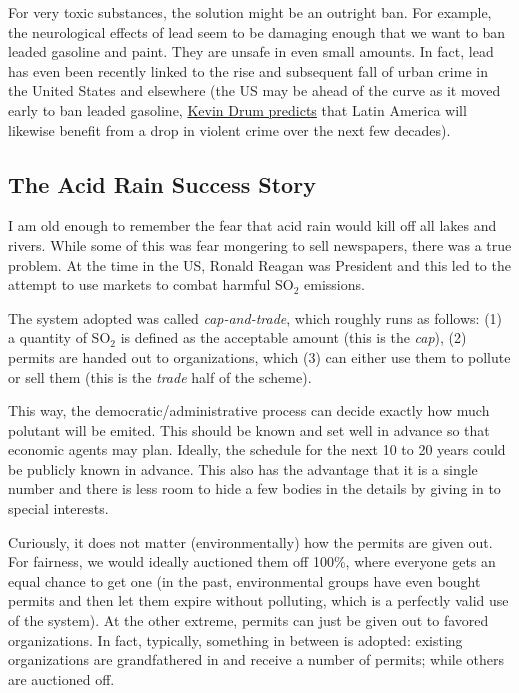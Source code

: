 For very toxic substances, the solution might be an outright ban. For example,
the neurological effects of lead seem to be damaging enough that we want to ban
leaded gasoline and paint. They are unsafe in even small amounts. In fact, lead
has even been recently linked to the rise and subsequent fall of urban crime in
the United States and elsewhere (the US may be ahead of the curve as it moved
early to ban leaded gasoline,
\href{http://www.motherjones.com/kevin-drum/2013/01/lead-and-crime-ill-be-melissa-harris-perry-show-sunday-10-am}{Kevin
Drum predicts} that Latin America will likewise benefit from a drop in violent
crime over the next few decades).

% 

\subsection{The Acid Rain Success Story}

I am old enough to remember the fear that acid rain would kill off all lakes
and rivers. While some of this was fear mongering to sell newspapers, there was
a true problem. At the time in the US, Ronald Reagan was President and this led
to the attempt to use markets to combat harmful SO${}_2$ emissions.

The system adopted was called \emph{cap-and-trade}, which roughly runs as
follows: (1) a quantity of SO${}_2$ is defined as the acceptable amount (this
is the \emph{cap}), (2) permits are handed out to organizations, which (3) can
either use them to pollute or sell them (this is the \emph{trade} half of the
scheme).

This way, the democratic/administrative process can decide exactly how much
polutant will be emited. This should be known and set well in advance so that
economic agents may plan. Ideally, the schedule for the next 10 to 20 years
could be publicly known in advance. This also has the advantage that it is a
single number and there is less room to hide a few bodies in the details by
giving in to special interests.

Curiously, it does not matter (environmentally) how the permits are given out.
For fairness, we would ideally auctioned them off 100\%, where everyone gets an
equal chance to get one (in the past, environmental groups have even bought
permits and then let them expire without polluting, which is a perfectly valid
use of the system). At the other extreme, permits can just be given out to
favored organizations. In fact, typically, something in between is adopted:
existing organizations are grandfathered in and receive a number of permits;
while others are auctioned off.


